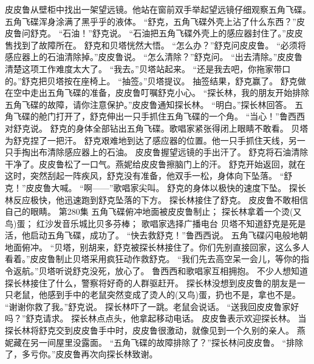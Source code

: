 \documentclass[a4paper,12pt,UTF8,twoside]{ctexbook}
\begin{document}
        皮皮鲁从壁柜中找出一架望远镜。他站在窗前双手举起望远镜仔细观察五角飞碟。  
        五角飞碟浑身涂满了黑乎乎的液体。  
        “舒克，五角飞碟外壳上沾了什么东西？”皮皮鲁问舒克。  
        “石油！”舒克说。  
        “石油把五角飞碟外壳上的感应器封住了。”皮皮售找到了故障所在。  
        舒克和贝塔恍然大悟。  
        “怎么办？”舒克问皮皮鲁。  
        “必须将感应器上的石油清除掉。”皮皮鲁说。  
        “怎么清除？”舒克问。  
        “出去清除。”皮皮鲁清楚这项工作难度太大了。  
        “我去。”贝塔站起来。  
        “还是我去吧，你拖家带口的。”舒克把贝塔按在座椅上。  
        “抽签。”贝塔提议。  
        抽签结果，舒克赢了。  
        舒克做在空中走出五角飞碟的准备，皮皮鲁叮嘱舒克小心。  
        “探长林，我的朋友开始排除五角飞碟的故障，请你注意保护。”皮皮鲁通知探长林。  
        “明白。”探长林回答。  
        五角飞碟的舱门打开了，舒克伸出一只手抓住五角飞碟的一个角。        
        “当心！”鲁西西对舒克说。  
        舒克的身体全部钻出五角飞碟。歌唱家紧张得闭上眼睛不敢看。  
        贝塔为舒克捏了一把汗。  
        舒克艰难地到达了感应器的位置。他一只手抓住天线，另一只手掏出布清除感应器上的石油。  
        皮皮鲁握望远镜的手出汗了。  
        舒克将石油清除干净了。皮皮鲁松了一口气。燕妮给皮皮鲁擦脑门上的汗。  
        舒克开始返回，就在这时，突然刮起一阵疾风，舒克没有准备，他双手一松，身体向下坠落。  
        “舒克！”皮皮鲁大喊。  
        “啊——”歌唱家尖叫。  
        舒克的身体以极快的速度下坠。  
        探长林反应极快，他迅速跑到舒克坠落的下方。  
        探长林接住了舒克。  
        皮皮鲁不敢相信自己的眼睛。          第280集  
        五角飞碟俯冲地面被皮皮鲁制止；  
        探长林拿着一个烫(又鸟)蛋；  
        红沙发音乐城比贝多芬棒；  
        歌唱家选择广播电台    
        贝塔不知道舒克是死是活，他启动五角飞碟，成功了。  
        “快去救舒克！”鲁西西说。  
        五角飞碟闪电般地朝地面俯冲。  
        “贝塔，别胡来，舒克被探长林接住了。你们先别直接回家，这么多人看着。”皮皮鲁制止贝塔采用疯狂动作救舒克。  
        “我们先去高空呆一会儿，等你的指令返航。”贝塔听说舒克没死，放心了。  
        鲁西西和歌唱家互相拥抱。  
        不少人想知道探长林接住了什么，警察将好奇的人群驱赶开。  
        探长林没想到皮皮鲁的朋友是一只老鼠，他感到手中的老鼠突然变成了烫人的(又鸟)蛋，扔也不是，拿也不是。  
        “谢谢你救了我。”舒克说。  
        探长林吓了一跳。老鼠会说话。  
        “送我回皮皮鲁家好吗？”舒克请求。  
        探长林点点头，他拿起移动电话。  
        皮皮鲁表示欢迎探长林。  
        当探长林将舒克交到皮皮鲁手中时，皮皮鲁很激动，就像见到一个久别的亲人。  
        燕妮藏在另一间屋里没露面。  
        “五角飞碟的故障排除了？”探长林问皮皮鲁。  
        “排除了，多亏你。”皮皮鲁再次向探长林致谢。  
\end{document}
